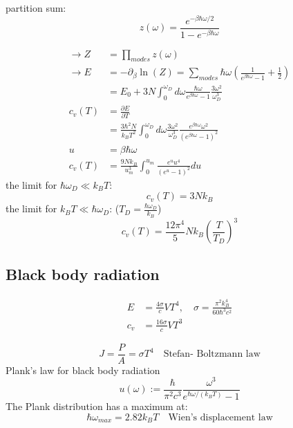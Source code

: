 partition sum:
\begin{equation*}
    z(\omega) = \frac{e^{-\beta \hbar \omega/2}}{1- e^{-\beta \hbar \omega}}
\end{equation*}

\begin{equation*}
    \begin{aligned}
        \rightarrow Z &= \prod_{modes} z(\omega) \\
        \rightarrow E &= - \partial_\beta \ln(Z) = \sum_{modes} \hbar \omega \left(\frac{1}{e^{\beta \hbar \omega}-1} +\frac{1}{2}\right)\\
            &= E_0 + 3N \int_0^{\omega_D} d\omega \frac{\hbar \omega}{e^{\beta \hbar \omega}-1} \frac{3 \omega^2}{\omega_D^3}\\
        c_v(T) &= \frac{\partial E}{\partial T} \\
            &= \frac{3 \hbar^2 N}{k_B T^2} \int_0^{\omega_D} d\omega \frac{3\omega^2}{\omega_D^3} \frac{e^{\beta \hbar \omega}\omega^2}{\left(e^{\beta \hbar \omega}-1\right)^2} \\
        u &= \beta \hbar \omega \\
        c_v(T) &= \frac{9Nk_B}{u_m^3} \int_0^{u_m} \frac{e^u u^4}{\left(e^u -1\right)^2} du
    \end{aligned}
\end{equation*}
the limit for $\hbar \omega_D \ll k_B T$:
\begin{equation*}
    c_v(T) = 3Nk_B
\end{equation*}
the limit for $k_B T \ll \hbar \omega_D$: ($T_D = \frac{\hbar \omega_D}{k_B}$)
\begin{equation*}
    c_v(T) = \frac{12 \pi^4}{5} N k_B \left(\frac{T}{T_D}\right)^3
\end{equation*}

\subsection*{Black body radiation}

\begin{equation*}
    \begin{aligned}
        E &= \frac{4 \sigma}{c} V T^4 , \quad \sigma = \frac{\pi^2 k_B^4}{60 \hbar^3 c^2} \\
        c_v &= \frac{16 \sigma}{c} V T^3
    \end{aligned}
\end{equation*}

\begin{equation*}
    J = \frac{P}{A} = \sigma T^4 \quad \text{Stefan- Boltzmann law}
\end{equation*}
Plank's law for black body radiation
\begin{equation*}
    u(\omega) := \frac{\hbar}{\pi^2 c^3} \frac{\omega^3}{e^{\hbar\omega/(k_BT)}-1}
\end{equation*}
The Plank distribution has a maximum at:
\begin{equation*}
    \hbar \omega_{max} = 2.82 k_B T \quad \text{Wien's displacement law}
\end{equation*}